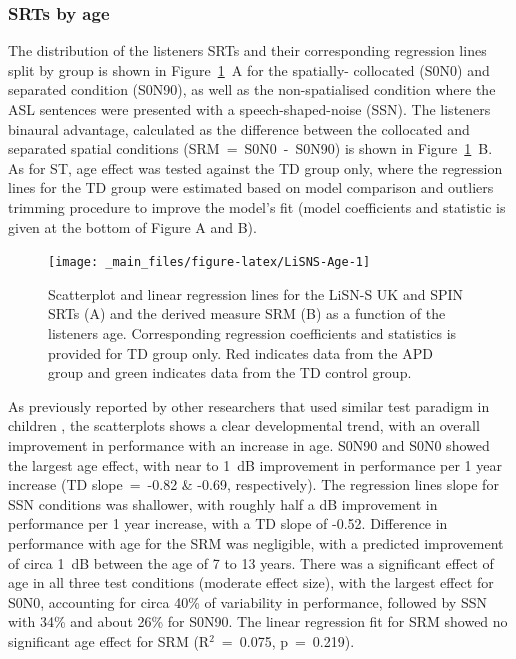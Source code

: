 \documentclass[a4paper, twoside]{templates/ociamthesis}
\begin{document}
\hypertarget{srts-by-age}{%
\subsubsection*{SRTs by age}\label{srts-by-age}}

The distribution of the listeners SRTs and their corresponding regression lines split by group is shown in Figure~\ref{fig:LiSNS-Age}~A for the spatially- collocated (S0N0) and separated condition (S0N90), as well as the non-spatialised condition where the ASL sentences were presented with a speech-shaped-noise (SSN). The listeners binaural advantage, calculated as the difference between the collocated and separated spatial conditions (SRM~=~S0N0~-~S0N90) is shown in Figure~\ref{fig:LiSNS-Age}~B. As for ST, age effect was tested against the TD group only, where the regression lines for the TD group were estimated based on model comparison and outliers trimming procedure to improve the model's fit (model coefficients and statistic is given at the bottom of Figure A and B).

\begin{figure}

{\centering \texttt{[image: \_main\_files/figure-latex/LiSNS-Age-1]} 

}

\caption{Scatterplot and linear regression lines for the LiSN-S UK and SPIN SRTs (A) and the derived measure SRM (B) as a function of the listeners age. Corresponding regression coefficients and statistics is provided for TD group only. Red indicates data from the APD group and green indicates data from the TD control group.}\label{fig:LiSNS-Age}
\end{figure}

As previously reported by other researchers that used similar test paradigm in children \autocites[e.g.,][]{Cameron2007,Murphy2019}, the scatterplots shows a clear developmental trend, with an overall improvement in performance with an increase in age. S0N90 and S0N0 showed the largest age effect, with near to 1~dB improvement in performance per 1 year increase (TD slope~=~-0.82 \& -0.69, respectively). The regression lines slope for SSN conditions was shallower, with roughly half a dB improvement in performance per 1 year increase, with a TD slope of -0.52. Difference in performance with age for the SRM was negligible, with a predicted improvement of circa 1~dB between the age of 7 to 13 years. There was a significant effect of age in all three test conditions (moderate effect size), with the largest effect for S0N0, accounting for circa 40\% of variability in performance, followed by SSN with 34\% and about 26\% for S0N90. The linear regression fit for SRM showed no significant age effect for SRM (R\(^{2}\)~=~0.075, p~=~0.219).
\end{document}
